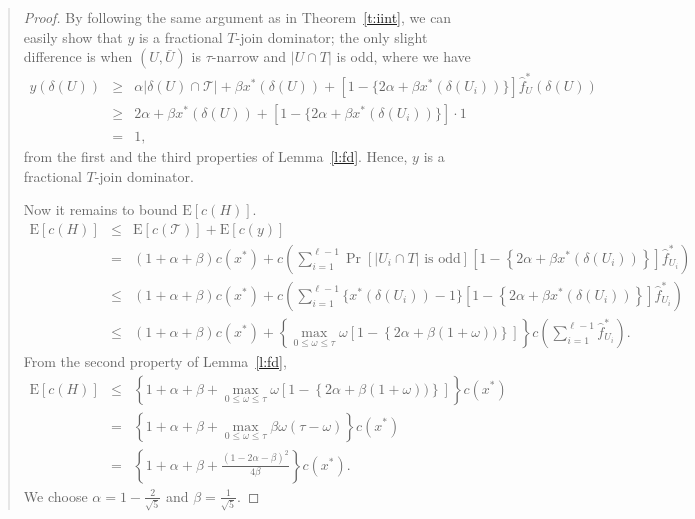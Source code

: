 \documentclass[11pt,letterpaper]{article}
\newcommand{\E}{\mathrm{E}}
\begin{document}
\begin{quote}
\begin{proof}
By following the same argument as in Theorem~\ref{t:iint}, we can easily show that $y$ is a fractional $T$-join dominator; the only slight difference is when $(U,\bar U)$ is $\tau$-narrow and $|U\cap T|$ is odd, where we have\begin{eqnarray*}
y(\delta(U)) &\geq& \alpha |\delta(U)\cap \mathscr{T}|+\beta x^*(\delta(U)) + \left[1-\{2\alpha+\beta x^*(\delta(U_i))\}\right] \hat f ^*_U(\delta(U))\\
&\geq& 2\alpha + \beta x^*(\delta(U)) + \left[1-\{2\alpha+\beta x^*(\delta(U_i))\}\right] \cdot 1\\
&=&1
,\end{eqnarray*}from the first and the third properties of Lemma~\ref{l:fd}. Hence, $y$ is a fractional $T$-join dominator.

Now it remains to bound $\E[c(H)]$.\begin{eqnarray}
\E[c(H)] &\leq& \E[c(\mathscr{T})] + \E[c(y)]\nonumber\\
&=& (1+\alpha+\beta)c(x^*)+ c\left(\sum_{i=1}^{\ell-1} \Pr[|U_i \cap T|\textrm{ is odd}] \left[1-\left\{2\alpha+\beta x^*(\delta(U_i))\right\}\right] \hat f ^*_{U_i}\right)\nonumber\\
&\leq& (1+\alpha+\beta)c(x^*)+ c\left(\sum_{i=1}^{\ell-1} \{x^*(\delta(U_i))-1\} \left[1-\left\{2\alpha+\beta x^*(\delta(U_i))\right\}\right] \hat f ^*_{U_i}\right)\nonumber\\
&\leq& (1+\alpha+\beta)c(x^*)+ \left\{\max_{0\leq\omega\leq \tau} \omega \left[1-\left\{2\alpha+\beta (1+\omega))\right\}\right] \right\} c\left(\sum_{i=1}^{\ell-1} \hat f ^*_{U_i}\right).\label{e:later2}
\end{eqnarray}From the second property of Lemma~\ref{l:fd},\begin{eqnarray*}
\E[c(H)] &\leq& \left\{ 1+\alpha+\beta+ \max_{0\leq\omega\leq \tau} \omega \left[1-\left\{2\alpha+\beta (1+\omega))\right\}\right] \right\}c(x^*)\\
&=& \left\{ 1+\alpha+\beta+ \max_{0\leq\omega\leq \tau} \beta\omega(\tau-\omega) \right\}c(x^*)\\
&=& \left\{ 1+\alpha+\beta+ \frac{(1-2\alpha-\beta)^2}{4\beta} \right\}c(x^*)
.\end{eqnarray*}
We choose $\alpha=1-\frac{2}{\sqrt{5}}$ and $\beta=\frac{1}{\sqrt{5}}$.
\end{proof}


\end{quote}
\end{document}
